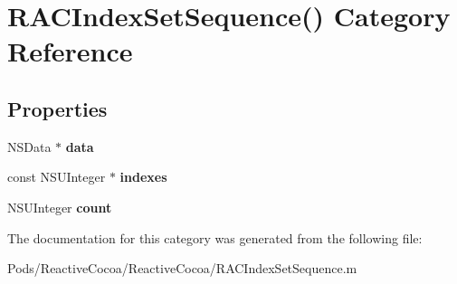 \hypertarget{category_r_a_c_index_set_sequence_07_08}{}\section{R\+A\+C\+Index\+Set\+Sequence() Category Reference}
\label{category_r_a_c_index_set_sequence_07_08}
\subsection*{Properties}
\begin{DoxyCompactItemize}
\item 
\mbox{\label{category_r_a_c_index_set_sequence_07_08_a57ed1e5825acbee4ff1e212b49c9e62e}} 
N\+S\+Data $\ast$ {\bfseries data}
\item 
\mbox{\label{category_r_a_c_index_set_sequence_07_08_a97d07418dad38eb56a3622bcca2f56e4}} 
const N\+S\+U\+Integer $\ast$ {\bfseries indexes}
\item 
\mbox{\label{category_r_a_c_index_set_sequence_07_08_aca26870d64e29b5f9186ade854d7fb6b}} 
N\+S\+U\+Integer {\bfseries count}
\end{DoxyCompactItemize}


The documentation for this category was generated from the following file\+:\begin{DoxyCompactItemize}
\item 
Pods/\+Reactive\+Cocoa/\+Reactive\+Cocoa/R\+A\+C\+Index\+Set\+Sequence.\+m\end{DoxyCompactItemize}
